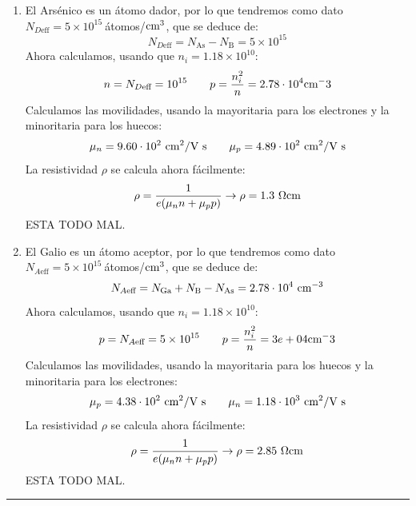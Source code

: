 \begin{enumerate}[label=\alph*)]
	\item El Arsénico es un átomo dador, por lo que tendremos como dato $N_{D\text{eff}}=5 \times 10^{15} \ $átomos/$\text{cm}^3$, que se deduce de:
	\begin{equation}
		N_{D\text{eff}} = N_{\text{As}} - N_{\text{B}} = 5 \times 10^{15}
	\end{equation}
	Ahora calculamos, usando que $n_i=1.18\times 10^{10}$:   
	\begin{equation}
		n = N_{D\text{eff}} = 10^{15} \qquad p = \frac{n_i^2}{n} = 2.78 \cdot 10^4 \text{cm}^-3
	\end{equation}
	Calculamos las movilidades, usando la mayoritaria para los electrones y la minoritaria para los huecos:
	\begin{equation}
		\mu_n=9.60 \cdot 10^2  \ \cm^2 /  \text{V s} \qquad 
		\mu_p=4.89 \cdot 10^2  \ \cm^2 /  \text{V s}
	\end{equation}
	La resistividad $\rho$ se calcula ahora fácilmente:
	\begin{equation}
		\rho = \frac{1}{e(\mu_n n + \mu_pp)} \rightarrow \rho = 1.3 \ \Omega \text{cm}
	\end{equation}
	ESTA TODO MAL.
	\item El Galio es un átomo aceptor, por lo que tendremos como dato $N_{A\text{eff}}=5 \times 10^{15} \ $átomos/$\text{cm}^3$, que se deduce de:
	\begin{equation}
		N_{A\text{eff}} = N_{\text{Ga}} + N_{\text{B}} - N_{\text{As}} =  2.78 \cdot 10^4 \ \text{cm}^{-3}
	\end{equation}
	Ahora calculamos, usando que $n_i=1.18\times 10^{10}$:   
	\begin{equation}
		p = N_{A\text{eff}} = 5 \times 10^{15} \qquad p = \frac{n_i^2}{n} = 3e+04 \text{cm}^-3
	\end{equation}
	Calculamos las movilidades, usando la mayoritaria para los huecos y la minoritaria para los electrones:
	\begin{equation}
		\mu_p=4.38 \cdot 10^{2}  \ \cm^2 /  \text{V s} \qquad 
		\mu_n=1.18 \cdot 10^{3} \ \cm^2 /  \text{V s}
	\end{equation}
	La resistividad $\rho$ se calcula ahora fácilmente:
	\begin{equation}
		\rho = \frac{1}{e(\mu_n n + \mu_pp)} \rightarrow 
		\rho = 2.85 \ \Omega \text{cm}
	\end{equation}
	ESTA TODO MAL.
\end{enumerate}

\rule{\textwidth}{0.1pt} \\[2pt]

